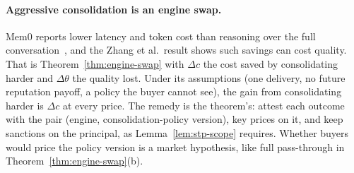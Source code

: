 \paragraph{Aggressive consolidation is an engine swap.} Mem0 reports lower
latency and token cost than reasoning over the full
conversation~, and the Zhang et al.\ result shows such
savings can cost quality. That is Theorem~\ref{thm:engine-swap} with $\Delta c$
the cost saved by consolidating harder and $\Delta\theta$ the quality lost.
Under its assumptions (one delivery, no future reputation payoff, a policy the
buyer cannot see), the gain from consolidating harder is $\Delta c$ at every
price. The remedy is the theorem's: attest each outcome with the pair (engine,
consolidation-policy version), key prices on it, and keep sanctions on the
principal, as Lemma~\ref{lem:stp-scope} requires. Whether buyers would price the policy version is a market hypothesis,
like full pass-through in Theorem~\ref{thm:engine-swap}(b).

\pdexercisepointer{\ref{ex:stp-consolidation-f4}}{\ref{ex:stp-bounded-coverage}}{\pageref{ex:stp-consolidation-f4}}
